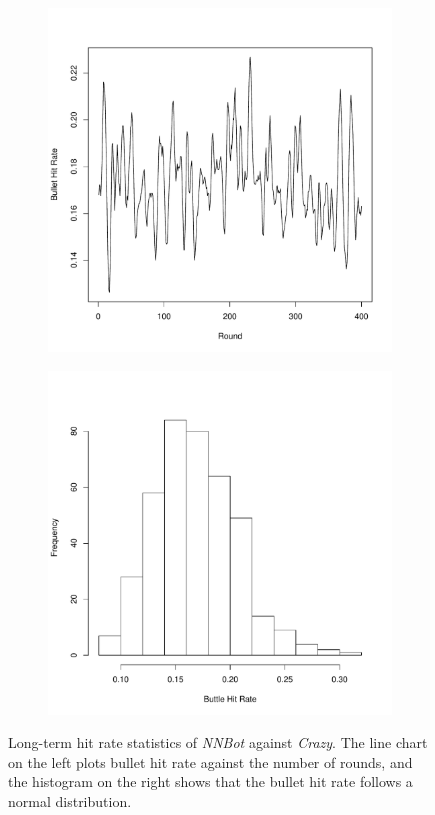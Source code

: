\documentclass[11pt,a4paper]{article}
\begin{document}
\begin{figure}[h]
	\centering
	\begin{subfigure}
		\centering
		\includegraphics[scale=0.45]{crazy_line.pdf}
	\end{subfigure}
	\begin{subfigure}
		\centering
		\includegraphics[scale=0.45]{crazy_hist.pdf}
	\end{subfigure}
	\caption{Long-term hit rate statistics of \emph{NNBot} against \emph{Crazy}. The line chart on the left plots bullet hit rate against the number of rounds, and the histogram on the right shows that the bullet hit rate follows a normal distribution.}
	\label{fig:crazy}
\end{figure}
\end{document}
